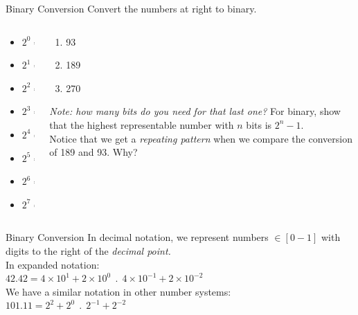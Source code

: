 \documentclass{beamer}
\begin{document}
\begin{frame}{Binary Conversion}
Convert the numbers at right to binary. \\ \vspace{1cm}
\begin{columns}[T]
\begin{column}{0.5\textwidth}
\begin{itemize}
\item $2^0 = 1$
\item $2^1 = 2$
\item $2^2 = 4$
\item $2^3 = 8$
\item $2^4 = 16$
\item $2^5 = 32$
\item $2^6 = 64$
\item $2^7 = 128$
\end{itemize}
\end{column}
\begin{column}{0.5\textwidth}
\small
\begin{enumerate}
\item 93
\item 189
\item 270
\end{enumerate}
\textit{Note: how many bits do you need for that last one?}  For binary, show that the highest representable number with $n$ bits is $2^n-1$. \\ \vspace{0.2cm}
Notice that we get a \textit{repeating pattern} when we compare the conversion of 189 and 93.  Why?
\end{column}
\end{columns}
\end{frame}

\begin{frame}{Binary Conversion}
In decimal notation, we represent numbers $\in [0-1]$ with digits to the right of the \textit{decimal point.} \\ \vspace{0.5cm}
In expanded notation: \\
$42.42 = 4\times 10^{1} + 2\times 10^{0} ~~ . ~~ 4\times 10^{-1} + 2\times 10^{-2}$ \\ \vspace{0.5cm}
We have a similar notation in other number systems: \\
$101.11 = 2^2 + 2^0 ~~ . ~~ 2^{-1} + 2^{-2}$
\end{frame}
\end{document}
